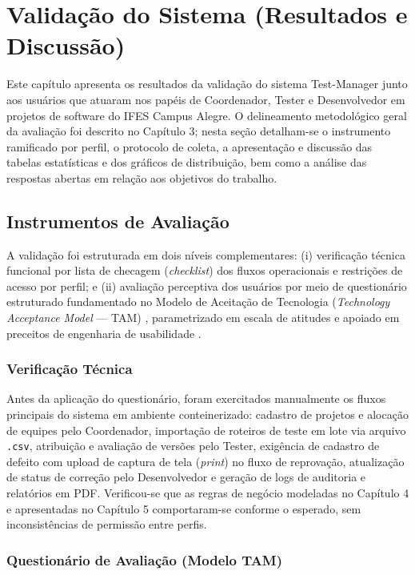 \chapter{Validação do Sistema (Resultados e Discussão)}

Este capítulo apresenta os resultados da validação do sistema Test-Manager junto aos usuários que atuaram nos papéis de Coordenador, Tester e Desenvolvedor em projetos de software do IFES Campus Alegre. O delineamento metodológico geral da avaliação foi descrito no Capítulo 3; nesta seção detalham-se o instrumento ramificado por perfil, o protocolo de coleta, a apresentação e discussão das tabelas estatísticas e dos gráficos de distribuição, bem como a análise das respostas abertas em relação aos objetivos do trabalho.

\section{Instrumentos de Avaliação}

A validação foi estruturada em dois níveis complementares: (i) verificação técnica funcional por lista de checagem (\textit{checklist}) dos fluxos operacionais e restrições de acesso por perfil; e (ii) avaliação perceptiva dos usuários por meio de questionário estruturado fundamentado no Modelo de Aceitação de Tecnologia (\textit{Technology Acceptance Model} --- TAM) \cite{davis1989, venkatesh2000}, parametrizado em escala de atitudes \cite{likert1932} e apoiado em preceitos de engenharia de usabilidade \cite{nielsen1994}.

\subsection{Verificação Técnica}

Antes da aplicação do questionário, foram exercitados manualmente os fluxos principais do sistema em ambiente conteinerizado: cadastro de projetos e alocação de equipes pelo Coordenador, importação de roteiros de teste em lote via arquivo \texttt{.csv}, atribuição e avaliação de versões pelo Tester, exigência de cadastro de defeito com upload de captura de tela (\textit{print}) no fluxo de reprovação, atualização de status de correção pelo Desenvolvedor e geração de logs de auditoria e relatórios em PDF. Verificou-se que as regras de negócio modeladas no Capítulo 4 e apresentadas no Capítulo 5 comportaram-se conforme o esperado, sem inconsistências de permissão entre perfis.

\subsection{Questionário de Avaliação (Modelo TAM)}

